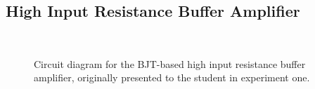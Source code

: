 \subsection{High Input Resistance Buffer Amplifier}
\begin{figure}[H]
	\centering
	\\
	\parbox{3.5in}{
	\caption[Schematic --- Buffer Amplifier]{Circuit diagram for the BJT-based high input
		resistance buffer amplifier, originally presented to the student in
		experiment one.}
	\label{fig:schem5}}
\end{figure}
